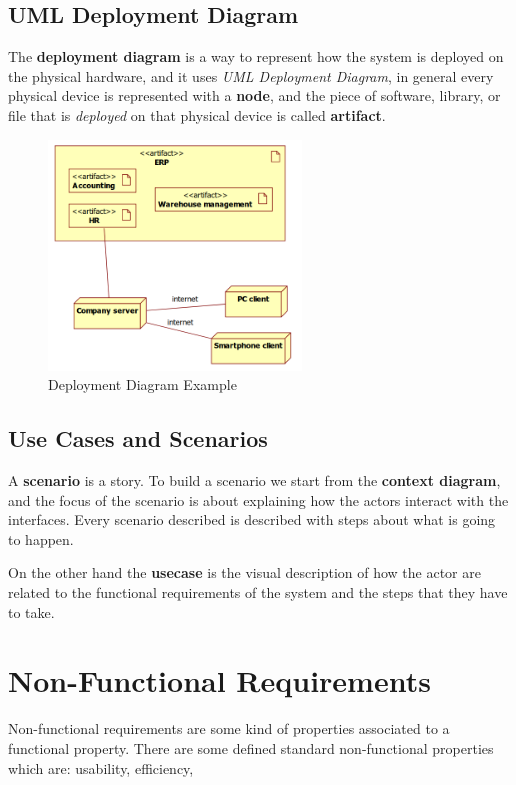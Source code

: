 \documentclass[12pt]{article}
\begin{document}
\subsection{UML Deployment Diagram}
The \textbf{deployment diagram} is a way to represent how the system is deployed on the physical hardware, and it uses \emph{UML Deployment Diagram}, in general every physical device is represented with a \textbf{node}, and the piece of software, library, or file that is \emph{deployed} on that physical device is called \textbf{artifact}.
\begin{figure}[H]
  \centering
  \includegraphics[width=0.6\textwidth]{deplyment-diagram-example.png}
  \caption{Deployment Diagram Example}
  \label{fig:deplyment-diagram-example}
\end{figure}



\subsection{Use Cases and Scenarios}
A \textbf{scenario} is a story. To build a scenario we start from the \textbf{context diagram}, and the focus of the scenario is about explaining how the actors interact with the interfaces. Every scenario described is described with steps about what is going to happen.

On the other hand the \textbf{usecase} is the visual description of how the actor are related to the functional requirements of the system and the steps that they have to take.





\section{Non-Functional Requirements}
Non-functional requirements are some kind of properties associated to a functional property. There are some defined standard non-functional properties which are: usability, efficiency,
\end{document}
